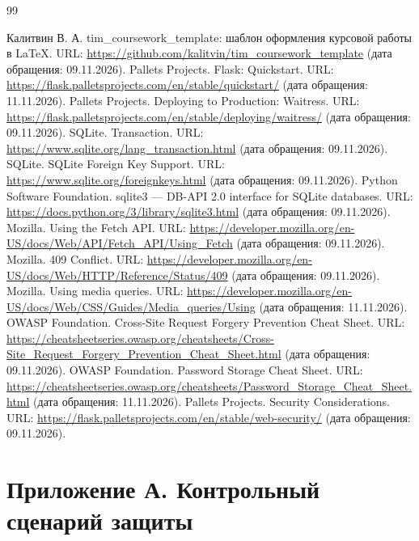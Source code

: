 \documentclass{timcw}
\begin{document}
\clearpage\centeredrefname
{}
\begin{thebibliography}{99}

 Калитвин В. А. tim\_coursework\_template: шаблон оформления курсовой работы в LaTeX. URL: \url{https://github.com/kalitvin/tim_coursework_template} (дата обращения: 09.11.2026).
 Pallets Projects. Flask: Quickstart. URL: \url{https://flask.palletsprojects.com/en/stable/quickstart/} (дата обращения: 11.11.2026).
 Pallets Projects. Deploying to Production: Waitress. URL: \url{https://flask.palletsprojects.com/en/stable/deploying/waitress/} (дата обращения: 09.11.2026).
 SQLite. Transaction. URL: \url{https://www.sqlite.org/lang_transaction.html} (дата обращения: 09.11.2026).
 SQLite. SQLite Foreign Key Support. URL: \url{https://www.sqlite.org/foreignkeys.html} (дата обращения: 09.11.2026).
 Python Software Foundation. sqlite3 — DB-API 2.0 interface for SQLite databases. URL: \url{https://docs.python.org/3/library/sqlite3.html} (дата обращения: 09.11.2026).
 Mozilla. Using the Fetch API. URL: \url{https://developer.mozilla.org/en-US/docs/Web/API/Fetch_API/Using_Fetch} (дата обращения: 09.11.2026).
 Mozilla. 409 Conflict. URL: \url{https://developer.mozilla.org/en-US/docs/Web/HTTP/Reference/Status/409} (дата обращения: 09.11.2026).
 Mozilla. Using media queries. URL: \url{https://developer.mozilla.org/en-US/docs/Web/CSS/Guides/Media_queries/Using} (дата обращения: 11.11.2026).
 OWASP Foundation. Cross-Site Request Forgery Prevention Cheat Sheet. URL: \url{https://cheatsheetseries.owasp.org/cheatsheets/Cross-Site_Request_Forgery_Prevention_Cheat_Sheet.html} (дата обращения: 09.11.2026).
 OWASP Foundation. Password Storage Cheat Sheet. URL: \url{https://cheatsheetseries.owasp.org/cheatsheets/Password_Storage_Cheat_Sheet.html} (дата обращения: 11.11.2026).
 Pallets Projects. Security Considerations. URL: \url{https://flask.palletsprojects.com/en/stable/web-security/} (дата обращения: 09.11.2026).

\end{thebibliography}
\clearpage\applications

\section*{Приложение А. Контрольный сценарий защиты}
\end{document}
